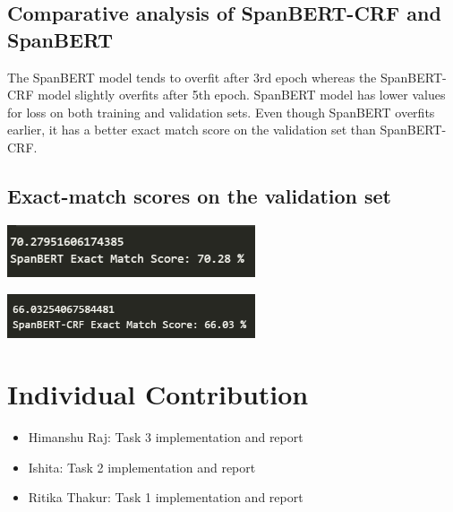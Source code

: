 \documentclass{article}
\begin{document}
\subsection{Comparative analysis of SpanBERT-CRF and SpanBERT}
The SpanBERT model tends to overfit after 3rd epoch whereas the SpanBERT-CRF model slightly overfits after 5th epoch. SpanBERT model has lower values for loss on both training and validation sets. Even though SpanBERT overfits earlier, it has a better exact match score on the validation set than SpanBERT-CRF.

\subsection{Exact-match scores on the validation set}
\begin{center}
    \includegraphics[width=0.55\textwidth]{spanbert_em.png}
\end{center}
\begin{center}
    \includegraphics[width=0.55\textwidth]{crf_em.png}
\end{center}

\section{Individual Contribution}
\begin{itemize}
    \item Himanshu Raj: Task 3 implementation and report
    \item Ishita: Task 2 implementation and report
    \item Ritika Thakur: Task 1 implementation and report
\end{itemize}
\end{document}

